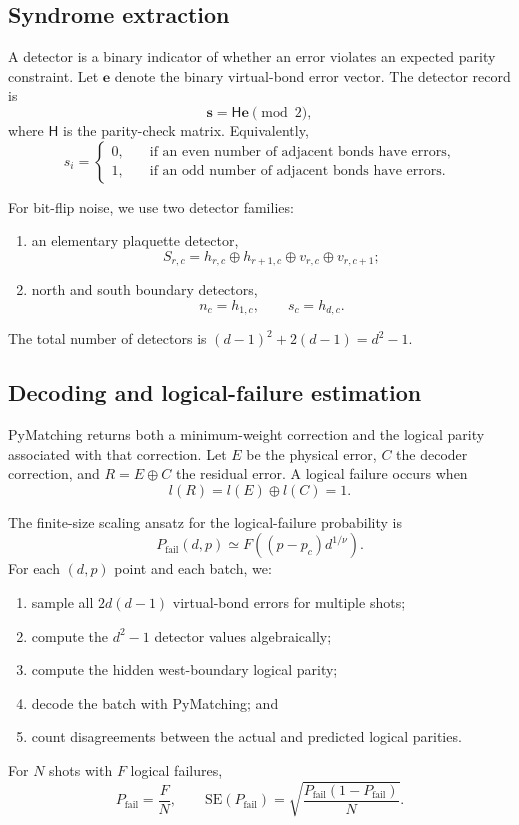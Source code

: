 \documentclass[11pt]{article}
\theoremstyle{definition}
\begin{document}
\subsection{Syndrome extraction}

A detector is a binary indicator of whether an error violates an expected
parity constraint. Let \(\mathbf e\) denote the binary virtual-bond error
vector. The detector record is
\[
\mathbf s=\mathsf H\mathbf e \pmod{2},
\]
where \(\mathsf H\) is the parity-check matrix. Equivalently,
\[
s_i=
\left\{
\begin{aligned}
  0, &\quad \text{if an even number of adjacent bonds have errors}, \\
  1, &\quad \text{if an odd number of adjacent bonds have errors}.
\end{aligned}
\right.
\]

For bit-flip noise, we use two detector families:
\begin{enumerate}
  \item an elementary plaquette detector,
  \[
  S_{r,c}=h_{r,c}\oplus h_{r+1,c}\oplus v_{r,c}\oplus v_{r,c+1};
  \]
  \item north and south boundary detectors,
  \[
  n_c=h_{1,c}, \qquad s_c=h_{d,c}.
  \]
\end{enumerate}
The total number of detectors is
\((d-1)^2+2(d-1)=d^2-1\).

\subsection{Decoding and logical-failure estimation}

PyMatching returns both a minimum-weight correction and the logical parity
associated with that correction. Let \(E\) be the physical error, \(C\) the
decoder correction, and \(R=E\oplus C\) the residual error. A logical failure
occurs when
\[
l(R)=l(E)\oplus l(C)=1.
\]

The finite-size scaling ansatz for the logical-failure probability is
\[
P_{\mathrm{fail}}(d,p)\simeq F\!\left((p-p_c)d^{1/\nu}\right).
\]
For each \((d,p)\) point and each batch, we:
\begin{enumerate}
  \item sample all \(2d(d-1)\) virtual-bond errors for multiple shots;
  \item compute the \(d^2-1\) detector values algebraically;
  \item compute the hidden west-boundary logical parity;
  \item decode the batch with PyMatching; and
  \item count disagreements between the actual and predicted logical parities.
\end{enumerate}
For \(N\) shots with \(F\) logical failures,
\[
P_{\mathrm{fail}}=\frac{F}{N},
\qquad
\mathrm{SE}(P_{\mathrm{fail}})
=\sqrt{\frac{P_{\mathrm{fail}}(1-P_{\mathrm{fail}})}{N}}.
\]
\end{document}
